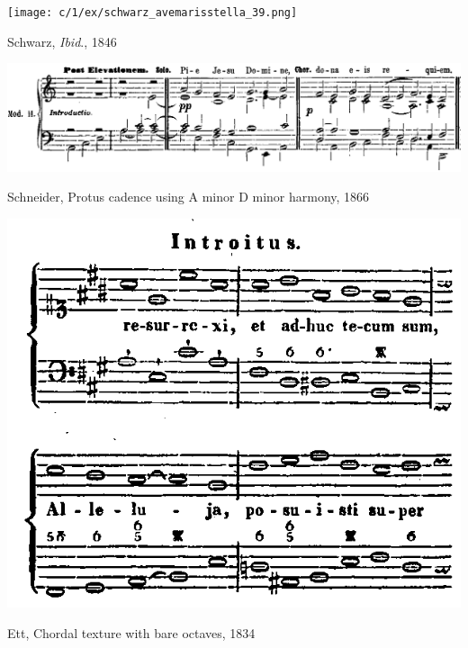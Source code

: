 \vspace*{\fill}

\begin{example}
  \centering
  \texttt{[image: c/1/ex/schwarz\_avemarisstella\_39.png]}
  \caption{Schwarz, \emph{Ibid}., 1846}
  \label{mus:schwarz_avemarisstella_39}
\end{example}

\vspace*{\fill}

\newpage

\vspace*{\fill}

\begin{example}
  \centering
  \includegraphics[width=\linewidth]{c/1/ex/schneider_piejesu_131.png}
  \caption{Schneider, Protus cadence using A minor \rightarrow{} D minor harmony, 1866}
  \label{mus:schneider_piejesu_131}
\end{example}

\vspace*{\fill}

\begin{example}
  \centering
  \includegraphics[width=.8\linewidth]{c/1/ex/ett_easterintroit_40.png}
  \caption{Ett, Chordal texture with bare octaves, 1834}
  \label{mus:ett_easterintroit_40}
\end{example}

